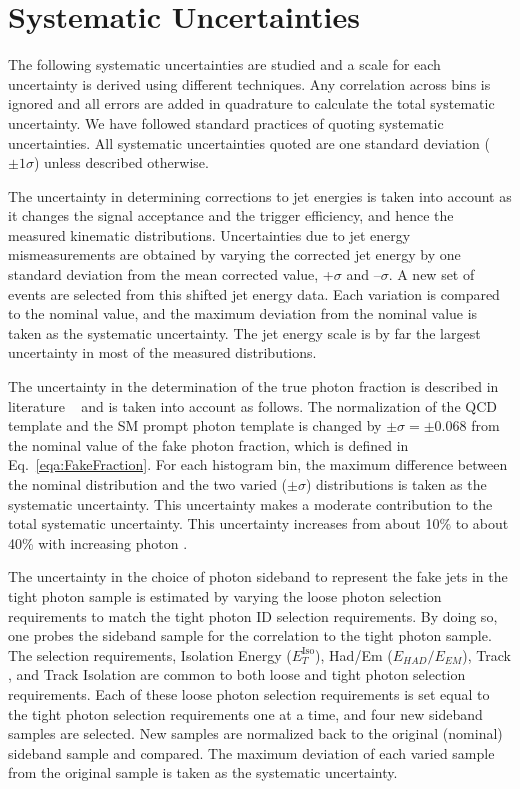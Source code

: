 \documentclass[12pt,twoside,letterpaper,doublespace]{article}
\begin{document}
\section{Systematic Uncertainties}
The following systematic uncertainties are studied and a scale for each uncertainty is derived using different techniques. Any correlation across bins is ignored and all errors are added in quadrature to calculate the total systematic uncertainty. We have followed standard practices of quoting systematic uncertainties. All systematic uncertainties quoted are one standard deviation ($\pm1\sigma$) unless described otherwise.

The uncertainty in determining corrections to jet energies is taken into account as it changes the signal acceptance and the trigger efficiency, and hence the measured kinematic distributions. Uncertainties due to jet energy mismeasurements are obtained by varying the corrected jet energy by one standard deviation from the mean corrected value, \mbox{+$\sigma$} and \mbox{--$\sigma$}. A new set of events are selected from this shifted jet energy data. Each variation is compared to the nominal value, and the  maximum deviation from the nominal value is taken as the systematic uncertainty. The jet energy scale is by far the largest uncertainty in most of the measured distributions.

The uncertainty in the determination of the true photon fraction is described in literature ~\cite{ref:PhotonIDAndCESCPR} and is taken into account as follows. The normalization of the QCD template and the SM prompt photon template is changed by $\pm\sigma = \pm 0.068$ from the nominal value of the fake photon fraction, which is defined in Eq.~\ref{eqa:FakeFraction}. For each histogram bin, the maximum difference between the nominal distribution and the two varied ($\pm \sigma$) distributions is taken as the systematic uncertainty. This uncertainty makes a moderate contribution to the total systematic uncertainty. This uncertainty increases from about 10\% to about 40\% with increasing photon \et.

The uncertainty in the choice of photon sideband to represent the fake jets in the tight photon sample is estimated by varying the loose photon selection requirements to match the tight photon ID selection requirements. By doing so, one probes the sideband sample for the correlation to the tight photon sample. The selection requirements, Isolation Energy ($E_{T}^{\mathrm{Iso}}$), Had/Em ($E_{HAD}/E_{EM}$), Track \pt, and Track Isolation are common to both loose and tight photon selection requirements. Each of these loose photon selection requirements is set equal to the tight photon selection requirements one at a time, and four new sideband samples are selected. New samples are normalized back to the original (nominal) sideband sample and compared. The maximum deviation of each varied sample from the original sample is taken as the systematic uncertainty.
\end{document}
